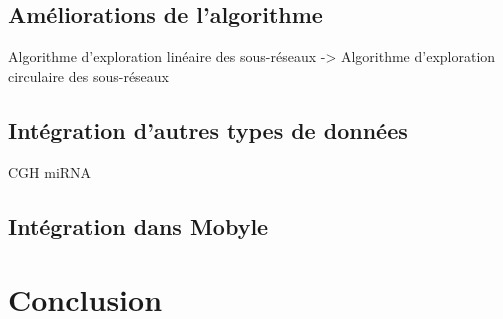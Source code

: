     \subsection{\textcolor{myblue}{Améliorations de l'algorithme}}
      Algorithme d'exploration linéaire des sous-réseaux -> Algorithme d'exploration circulaire des sous-réseaux
    \subsection{\textcolor{myblue}{Intégration d'autres types de données}}
      CGH
      miRNA
    \subsection{\textcolor{myblue}{Intégration dans Mobyle}}

  \section{\textcolor{myblue}{Conclusion}}

